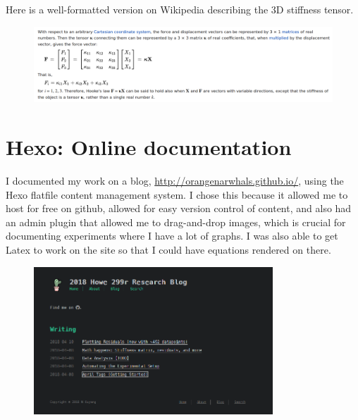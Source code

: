 \documentclass[preprint,12pt,3p]{elsarticle}
\begin{document}
Here is a well-formatted version on Wikipedia describing the 3D stiffness tensor. 

\begin{figure}[H]
\centering
\includegraphics[width=\textwidth]{images/misc/stiffness_tensor.png}
\end{figure}



\newpage

\section{Hexo: Online documentation}

I documented my work on a blog, \url{http://orangenarwhals.github.io/}, using the Hexo flatfile content
management system. I chose this because it allowed me to host for free on github, allowed for easy
version control of content, and also had an admin plugin that allowed me to drag-and-drop images,
which is crucial for documenting experiments where I have a lot of graphs. I was also able to get
Latex to work on the site so that I could have equations rendered on there.

\begin{figure}[H]
\centering
\includegraphics[width=0.8\textwidth]{images/misc/blog.png}
\end{figure}
\end{document}
